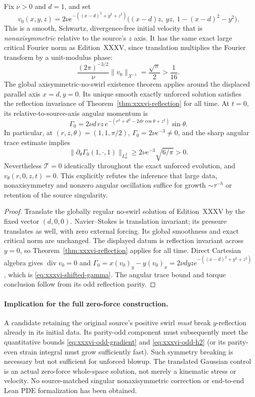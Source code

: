 \begin{theorem}
\label{thm:xxxvi-shifted}
Fix $\nu>0$ and $d=1$, and set
\[
\boxed{
v_0(x,y,z)=2\nu e^{-((x-d)^2+y^2+z^2)}
\bigl((x-d)z,\ yz,\ 1-(x-d)^2-y^2\bigr).
}
\]
This is a smooth, Schwartz, divergence-free
initial velocity that is \emph{nonaxisymmetric}
relative to the source's $z$ axis.
It has the same exact large critical Fourier norm
as Edition~XXXV, since translation multiplies the
Fourier transform by a unit-modulus phase:
\[
\frac{(2\pi)^{-3/2}}{\nu}
\|v_0\|_{\mathcal X^{-1}}
=\frac{\sqrt\pi}{2}>\frac1{16}.
\]
The global axisymmetric-no-swirl existence theorem
applies around the displaced parallel axis $x=d,y=0$.
Its unique smooth exactly unforced solution
satisfies the reflection invariance of
Theorem~\ref{thm:xxxvi-reflection} for all time.
At $t=0$, its relative-to-source-axis angular momentum is
\begin{equation}\label{eq:xxxvi-shifted-gamma}
\boxed{\quad
\Gamma_0=2\nu d\,r z\,
e^{-(r^2+d^2-2dr\cos\theta+z^2)}\sin\theta.\quad}
\end{equation}
In particular, at $(r,z,\theta)=(1,1,\pi/2)$,
$\Gamma_0=2\nu e^{-3}\ne0$, and the sharp angular
trace estimate implies
\[
\|\partial_\theta\Gamma_0(1,\cdot,1)\|_{L^2_\theta}
\ge 2\nu e^{-3}\sqrt{6/\pi}>0.
\]
Nevertheless $\mathcal T=0$ identically throughout
the exact unforced evolution, and
$v_\theta(r,0,z,t)=0$. This explicitly refutes
the inference that large data, nonaxisymmetry and
nonzero angular oscillation suffice for growth
$\sim\tau^{-h}$ or retention of the source singularity.
\end{theorem}
\begin{proof}
Translate the globally regular no-swirl solution
of Edition~XXXV by the fixed vector $(d,0,0)$.
Navier--Stokes is translation invariant; its pressure
translates as well, with zero external forcing.
Its global smoothness and exact critical norm are unchanged.
The displayed datum is reflection invariant across
$y=0$, so Theorem~\ref{thm:xxxvi-reflection}
applies for all time. Direct Cartesian algebra gives
$\operatorname{div}v_0=0$ and
$\Gamma_0=x(v_0)_y-y(v_0)_x
=2\nu d y z e^{-((x-d)^2+y^2+z^2)}$,
which is \eqref{eq:xxxvi-shifted-gamma}.
The angular trace bound and torque conclusion
follow from its odd reflection parity.
\end{proof}

\paragraph{Implication for the full zero-force construction.}
A candidate retaining the original source's
positive swirl \emph{must} break $y$-reflection
already in its initial data. Its parity-odd
component must subsequently meet the
quantitative bounds \eqref{eq:xxxvi-odd-gradient}
and \eqref{eq:xxxvi-odd-h2} (or its parity-even
strain integral must grow sufficiently fast).
Such symmetry breaking is necessary but
not sufficient for unforced blowup.
The translated Gaussian control is an
actual zero-force whole-space solution,
not merely a kinematic stress or velocity.
No source-matched singular nonaxisymmetric
correction or end-to-end Lean PDE
formalization has been obtained.
